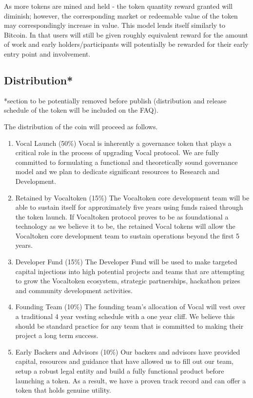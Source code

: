 \documentclass[conference]{IEEEtran}
\begin{document}
     As more tokens are mined and held - the token quantity reward granted will diminish; however, the corresponding market or redeemable value of the token may correspondingly increase in value. This model lends itself similarly to Bitcoin. In that users
     will still be given roughly equivalent reward for the amount of work and early holders/participants will potentially be rewarded for their early entry point and involvement.

    \subsection{Distribution*}
    *section to be potentially removed before publish (distribution and release schedule of the token will be included on the FAQ).

    The distribution of the coin will proceed as follows.


    \begin{enumerate}
    \item Vocal Launch (50\%)
    Vocal is inherently a governance token that plays a critical role in the process of upgrading Vocal protocol. We are fully committed to formulating a functional and theoretically sound governance model and we plan to dedicate significant resources to Research and Development.
    \item Retained by Vocaltoken (15\%)
    The Vocaltoken core development team will be able to sustain itself for approximately five years using funds raised through the token launch. If Vocaltoken protocol proves to be as foundational a technology as we believe it to be, 
    the retained Vocal tokens will allow the Vocaltoken core development team to sustain operations beyond the first 5 years.
    \item Developer Fund (15\%)
    The Developer Fund will be used to make targeted capital injections into high potential projects and teams that are attempting to grow the Vocaltoken ecosystem, strategic partnerships, hackathon prizes and community development activities.
    \item Founding Team (10\%)
    The founding team’s allocation of Vocal will vest over a traditional 4 year vesting schedule with a one year cliff. We believe this should be standard practice for any team that is committed to making their project a long term success.
    \item Early Backers and Advisors (10\%)
    Our backers and advisors have provided capital, resources and guidance that have allowed us to fill out our team, setup a robust legal entity and build a fully functional product before launching a token. As a result, we have a proven track record and can offer a token that holds genuine utility.
    \end{enumerate}
    
\end{document}
